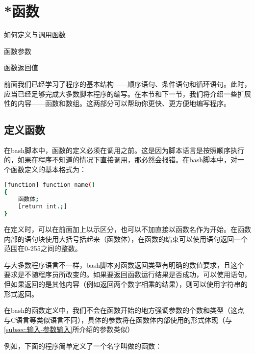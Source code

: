 \section{*函数}\label{sec:函数}

\begin{Abstract}
    \item 如何定义与调用函数
    \item 函数参数
    \item 函数返回值
\end{Abstract}

前面我们已经学习了程序的基本结构——顺序语句、条件语句和循环语句。此时，应当已经足够完成大多数脚本程序的编写。在本节和下一节，我们将介绍一些扩展性的内容——函数和数组。这两部分可以帮助你更快、更方便地编写程序。

\subsection{定义函数}\label{subsec:函数-定义函数}

在bash脚本中，函数的定义必须在调用之前。这是因为脚本语言是按照顺序执行的，如果在程序不知道的情况下直接调用，那必然会报错。在bash脚本中，对一个函数定义的基本格式为：

\begin{lstlisting}[language=bash]
[function] function_name()
{
    函数体;
    [return int.;]
}
\end{lstlisting}

在定义时，可以在前面加上以示区分，也可以不加直接以函数名作为开始。在函数内部的语句块使用大括号括起来（函数体），在函数的结束可以使用语句返回一个范围在0-255之间的整数。

\begin{attention}
    与大多数程序语言不一样，bash脚本对函数返回类型有明确的数值要求，且这个要求是不随程序员所改变的。如果要返回函数运行结果是否成功，可以使用语句，但如果返回的是其他内容（例如返回两个数字相乘的结果），则可以使用字符串的形式返回。

    在bash的函数定义中，我们不会在函数开始的地方强调参数的个数和类型（这点与C语言等类似语言不同），具体的参数将在函数体内部使用的形式体现（与\ref{subsec:输入-参数输入}所介绍的参数类似）
\end{attention}

例如，下面的程序简单定义了一个名字叫做的函数：

